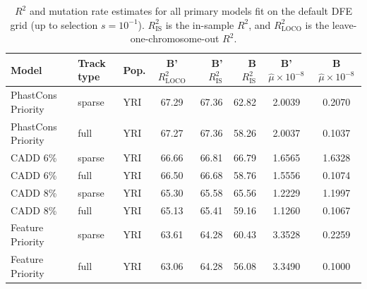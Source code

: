 \documentclass[11pt]{article}
\begin{document}
\begin{table}
    \label{supp:tbl-r2}
\centering

\caption{$R^2$ and mutation rate estimates for all primary models fit on the
default DFE grid (up to selection $s=10^{-1}$). $R_\text{IS}^2$ is the
in-sample $R^2$, and $R_\text{LOCO}^2$ is the leave-one-chromosome-out $R^2$.}

\begin{tabular}{lll|crr|cc}
    \textbf{Model} & \textbf{Track type} & \textbf{Pop.} & \textbf{B' $R_\text{LOCO}^2$} & \textbf{B' $R_\text{IS}^2$} & \textbf{B $R_\text{IS}^2$} & \textbf{B' $\hat{\mu} \times 10^{-8}$} & \textbf{B $\hat{\mu} \times 10^{-8}$} \\[0.5ex] 
\hline
\hline
PhastCons Priority &            sparse &          YRI &                        67.29 &             67.36 &            62.82 &                                 2.0039 &                                0.2070 \\
PhastCons Priority &              full &          YRI &                        67.27 &             67.36 &            58.26 &                                 2.0037 &                                0.1037 \\
          CADD 6\% &            sparse &          YRI &                        66.66 &             66.81 &            66.79 &                                 1.6565 &                                1.6328 \\
          CADD 6\% &              full &          YRI &                        66.50 &             66.68 &            58.76 &                                 1.5556 &                                0.1074 \\
          CADD 8\% &            sparse &          YRI &                        65.30 &             65.58 &            65.56 &                                 1.2229 &                                1.1997 \\
          CADD 8\% &              full &          YRI &                        65.13 &             65.41 &            59.16 &                                 1.1260 &                                0.1067 \\
  Feature Priority &            sparse &          YRI &                        63.61 &             64.28 &            60.43 &                                 3.3528 &                                0.2259 \\
  Feature Priority &              full &          YRI &                        63.06 &             64.28 &            56.08 &                                 3.3490 &                                0.1000 \\

\end{tabular}
\end{table}
\end{document}
